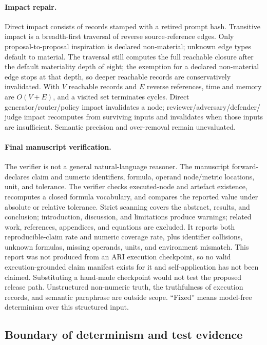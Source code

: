 \paragraph{Impact repair.}
Direct impact consists of records stamped with a retired prompt hash.
Transitive impact is a breadth-first traversal of reverse source-reference
edges. Only proposal-to-proposal inspiration is declared non-material;
unknown edge types default to material. The traversal still computes the full
reachable closure after the default materiality depth of eight; the exemption
for a declared non-material edge stops at that depth, so deeper reachable
records are conservatively invalidated. With $V$ reachable records and $E$
reverse references, time and memory are $O(V+E)$, and a visited set terminates
cycles. Direct
generator/router/policy impact invalidates a node; reviewer/adversary/defender/
judge impact recomputes from surviving inputs and invalidates when those
inputs are insufficient. Semantic precision and over-removal remain
unevaluated.

\paragraph{Final manuscript verification.}
The verifier is not a general natural-language reasoner. The manuscript
forward-declares claim and numeric identifiers, formula, operand node/metric
locations, unit, and tolerance. The verifier checks executed-node and
artefact existence, recomputes a closed formula vocabulary, and compares the
reported value under absolute or relative tolerance. Strict scanning covers
the abstract, results, and conclusion; introduction, discussion, and
limitations produce warnings; related work, references, appendices, and
equations are excluded. It reports both reproducible-claim rate and numeric
coverage rate, plus identifier collisions, unknown formulas, missing
operands, units, and environment mismatch. This report was not produced from
an ARI execution checkpoint, so no valid execution-grounded claim manifest
exists for it and self-application has not been claimed. Substituting a
hand-made checkpoint would not test the proposed release path. Unstructured non-numeric truth,
the truthfulness of execution records, and semantic paraphrase are outside
scope. ``Fixed'' means model-free determinism over this structured input.

\subsection{Boundary of determinism and test evidence}\label{sec:appendix:determinism}

